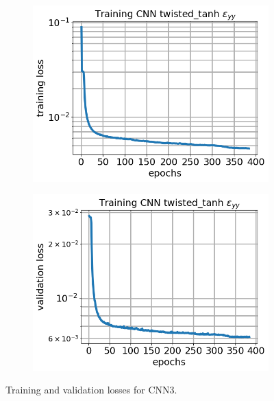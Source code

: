 \documentclass[12pt]{article}
\newcommand{\nhghalfwidth}{0.48\linewidth}
\newcommand{\nhgtotalheight}{4cm}
\begin{document}
\begin{figure}[!h]
  \centering
  \begin{subfigure}[c]{\nhghalfwidth}
    \centering
    \includegraphics[totalheight=\nhgtotalheight]{Figures/Results3/loss.png}
  \end{subfigure}
%  
  \begin{subfigure}[c]{\nhghalfwidth}
    \centering
    \includegraphics[totalheight=\nhgtotalheight]{Figures/Results3/val_loss.png}
  \end{subfigure}
  \caption{\label{fig:cnn3losses} Training and validation losses for CNN3.}
\end{figure}
%
\end{document}
